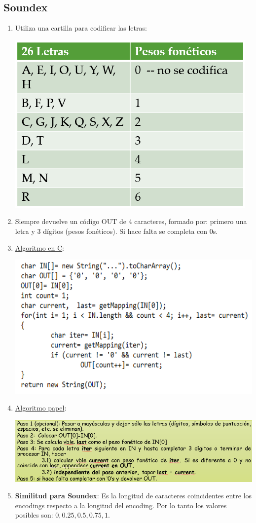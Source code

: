 \documentclass{article}
\begin{document}
\subsection{Soundex}
\begin{enumerate}
    \item Utiliza una cartilla para codificar las letras:
    \begin{center}
        \includegraphics[width=.40\textwidth]{Images/SoundexTabla.png}
    \end{center}
    \item Siempre devuelve un código OUT de 4 caracteres, formado por: primero una letra y 3 dígitos (pesos fonéticos). Si hace falta se completa con 0s.
    \item \underline{Algoritmo en C}:
    \begin{center}
        \includegraphics[width=.60\textwidth]{Images/SoundexAlgoritmo.png}
    \end{center}
    \item \underline{Algoritmo papel}:
    \begin{center}
        \includegraphics[width=.60\textwidth]{Images/SoundexAlgoritmoPapel.png}
    \end{center}
    \item \textbf{Similitud para Soundex}: Es la longitud de caracteres coincidentes entre los encodings respecto a la longitud del encoding. Por lo tanto los valores posibles son: $0, 0.25, 0.5, 0.75, 1$.
\end{enumerate}
    
\end{document}
